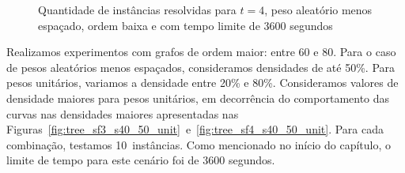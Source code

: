 \begin{figure}%
    \centering
    \caption{Quantidade de instâncias resolvidas para $t = 4$, peso
      aleatório menos espaçado, ordem baixa e com tempo limite de 3600
      segundos}%
    \label{fig:tree_sf4_s20_30_small_random_high_time}%
\end{figure}


Realizamos experimentos com grafos de ordem maior: entre 60 e 80.
Para o caso de pesos aleatórios menos espaçados, consideramos
densidades de até 50\%.  Para pesos unitários, variamos a densidade
entre 20\% e 80\%.  Consideramos valores de densidade maiores para
pesos unitários, em decorrência do comportamento das curvas nas
densidades maiores apresentadas nas
Figuras~\ref{fig:tree_sf3_s40_50_unit}~e~\ref{fig:tree_sf4_s40_50_unit}.
Para cada combinação, testamos 10~instâncias. Como mencionado no
início do capítulo, o limite de tempo para este cenário foi de 3600
segundos.

